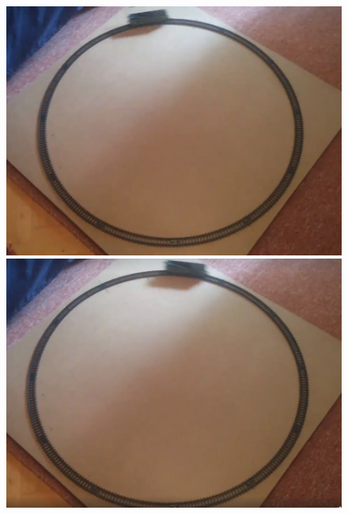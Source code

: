 \documentclass[a4paper,12pt]{article}
\begin{document}
\begin{figure}[htp]
    \centering
    \begin{minipage}{0.32\textwidth}
        \centering
        \includegraphics[width=\linewidth]{images/tm_moving_1.png}
    \end{minipage}\hfill
    \begin{minipage}{0.32\textwidth}
        \centering
        \includegraphics[width=\linewidth]{images/tm_moving_2.png}
    \end{minipage}\hfill
    \begin{minipage}{0.32\textwidth}
        \centering

\end{minipage}
\end{figure}
\end{document}
